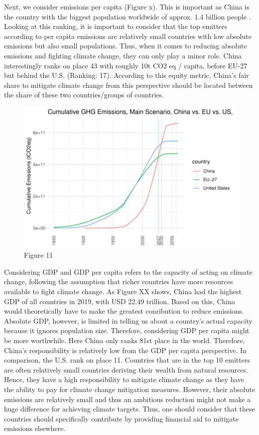 \documentclass[
  12pt,
]{article}
\numberwithin{equation}{section}
\numberwithin{table}{section}
\numberwithin{figure}{section}
\begin{document}
Next, we consider emissions per capita (Figure x). This is important as
China is the country with the biggest population worldwide of approx.
1.4 billion people \citep{WorldBank2022c}. Looking at this ranking, it
is important to consider that the top emitters according to per capita
emissions are relatively small countries with low absolute emissions but
also small populations. Thus, when it comes to reducing absolute
emissions and fighting climate change, they can only play a minor role.
China interestingly ranks on place 43 with roughly 10t CO2 eq / capita,
before EU-27 but behind the U.S. (Ranking: 17). According to this equity
metric, China's fair share to mitigate climate change from this
perspective should be located between the share of these two
countries/groups of countries.

\begin{figure}
\centering
\includegraphics{Paper_files/figure-latex/unnamed-chunk-11-1.pdf}
\caption{Figure 11}
\end{figure}

Considering GDP and GDP per capita refers to the capacity of acting on
climate change, following the assumption that richer countries have more
resources available to fight climate change. As Figure XX shows, China
had the highest GDP of all countries in 2019, with USD 22.49 trillion.
Based on this, China would theoretically have to make the greatest
conribution to reduce emissions. Absolute GDP, however, is limited in
telling us about a country's actual capacity because it ignores
population size. Therefore, considering GDP per capita might be more
worthwhile. Here China only ranks 81st place in the world. Therefore,
China's responsibility is relatively low from the GDP per capita
perspective. In comparison, the U.S. rank on place 11. Countries that
are in the top 10 emitters are often relatively small countries deriving
their wealth from natural resources. Hence, they have a high
responsibility to mitigate climate change as they have the ability to
pay for climate change mitigation measures. However, their absolute
emissions are relatively small and thus an ambitious reduction might not
make a huge difference for achieving climate targets. Thus, one should
consider that these countries should specifically contribute by
providing financial aid to mitigate emissions elsewhere.
\end{document}
